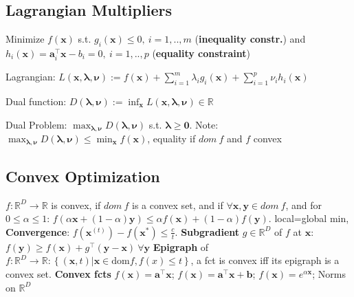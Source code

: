 \documentclass[a4paper, 11pt, landscape]{article}
\begin{document}
\begin{multicols*}{3}
\subsection{Lagrangian Multipliers}
Minimize  $f(\mathbf{x})$ s.t. $g_i(\mathbf{x}) \leq 0,\ i = 1, .., m$ (\textbf{inequality constr.}) and $h_i(\mathbf{x}) = \mathbf{a}_i^\top \mathbf{x} - b_i = 0,\ i = 1, .., p$ (\textbf{equality constraint})
\begin{compactdesc}
	\item[Lagrangian:] $L(\mathbf{x}, \bm{\lambda}, \bm{\nu}) := f(\mathbf{x}) + \sum_{i=1}^m \lambda_i g_i(\mathbf{x}) + \sum_{i=1}^p \nu_i h_i(\mathbf{x})$
	\item[Dual function:] $D(\bm{\lambda}, \bm{\nu}) := \inf_{\mathbf{x}} L(\mathbf{x}, \bm{\lambda}, \bm{\nu}) \in \mathbb{R}$
	\item[Dual Problem:] $\max_{\bm{\lambda}, \bm{\nu}} D(\bm{\lambda}, \bm{\nu})$ s.t. $\bm{\lambda} \geq \mathbf{0}$. Note: $\max_{\bm{\lambda}, \bm{\nu}} D(\bm{\lambda}, \bm{\nu}) \le \min_\mathbf{x}{f(\mathbf{x})}$, equality if $dom\ f$ and $f$ convex
\end{compactdesc}

\subsection{Convex Optimization}
$f : \mathbb{R}^D \rightarrow \mathbb{R}$ is convex, if $dom\ f$ is a convex set, and if $\forall \mathbf{x}, \mathbf{y} \in dom\ f$, and for $0 \leq \alpha \leq 1$: $f(\alpha \mathbf{x} + (1 - \alpha)\mathbf{y}) \leq \alpha f(\mathbf{x}) + (1-\alpha)f(\mathbf{y})$. local=global min, \textbf{Convergence}: $f(\mathbf{x}^{(t)}) - f(\mathbf{x}^*) \le \frac{c}{t}$.
\textbf{Subgradient} $g \in \mathbb{R}^D$ of $f$ at $\mathbf{x}$: $f(\mathbf{y}) \geq f(\mathbf{x}) + g^\top(\mathbf{y}-\mathbf{x}) \ \forall \mathbf{y}$
\textbf{Epigraph} of $f:\mathbb{R}^D \rightarrow \mathbb{R}: \left\{ (\mathbf{x}, t) | \mathbf{x} \in \mathrm{dom} f, f(x) \le t\right\}$, a fct is convex iff its epigraph is a convex set.
\textbf{Convex fcts} $f(\mathbf{x}) = \mathbf{a}^\top \mathbf{x}$; $f(\mathbf{x}) = \mathbf{a}^\top \mathbf{x} + \mathbf{b}$; $f(\mathbf{x}) = e^{\alpha \mathbf{x}}$; Norms on $\mathbb{R}^D$


\end{multicols*}
\end{document}
